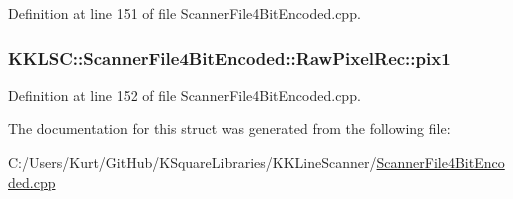 Definition at line 151 of file Scanner\+File4\+Bit\+Encoded.\+cpp.

\subsubsection[{\texorpdfstring{pix1}{pix1}}]{ K\+K\+L\+S\+C\+::\+Scanner\+File4\+Bit\+Encoded\+::\+Raw\+Pixel\+Rec\+::pix1}\hypertarget{struct_scanner_file4_bit_encoded_1_1_raw_pixel_rec_a78d43582be2d3f1def955dda2c585b07}{}\label{struct_scanner_file4_bit_encoded_1_1_raw_pixel_rec_a78d43582be2d3f1def955dda2c585b07}


Definition at line 152 of file Scanner\+File4\+Bit\+Encoded.\+cpp.



The documentation for this struct was generated from the following file\+:\begin{DoxyCompactItemize}
\item 
C\+:/\+Users/\+Kurt/\+Git\+Hub/\+K\+Square\+Libraries/\+K\+K\+Line\+Scanner/\hyperlink{_scanner_file4_bit_encoded_8cpp}{Scanner\+File4\+Bit\+Encoded.\+cpp}\end{DoxyCompactItemize}

